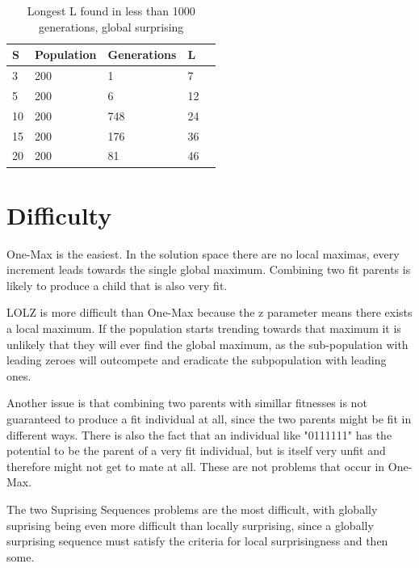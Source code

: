 \begin{table}
    \begin{tabular}{lllll}
        S  & Population & Generations & L%
        \\ \hline
        3  & 200 & 1    & 7
        \\
        5  & 200 & 6    & 12
        \\
        10 & 200 & 748  & 24
        \\
        15 & 200 & 176  & 36
        \\
        20 & 200 & 81   & 46
        \\
    \end{tabular}
    \caption{Longest L found in less than 1000 generations, global surprising}
\end{table}

\section*{Difficulty}
One-Max is the easiest.
In the solution space there are no local maximas,
every increment leads towards the single global maximum.
Combining two fit parents is likely to produce a child that is also very fit.

LOLZ is more difficult than One-Max because the z parameter means there exists a local maximum.
If the population starts trending towards that maximum it is unlikely that they will ever find the global maximum,
as the sub-population with leading zeroes will outcompete and eradicate the subpopulation with leading ones.

Another issue is that combining two parents with simillar fitnesses is not guaranteed to produce a fit individual at all, since the two parents might be fit in different ways.
There is also the fact that an individual like "0111111" has the potential to be the parent of a very fit individual,
but is itself very unfit and therefore might not get to mate at all.
These are not problems that occur in One-Max.

The two Suprising Sequences problems are the most difficult,
with globally suprising being even more difficult than locally surprising,
since a globally surprising sequence must satisfy the criteria for local surprisingness and then some.

